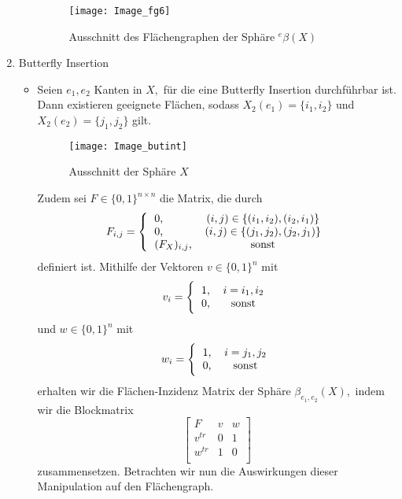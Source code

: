 \documentclass[12pt,titlepage,twoside,cleardoublepage]{article}
\theoremstyle{nummermitklammern}
\numberwithin{equation}{section}
\begin{document}
\begin{enumerate}
\begin{itemize}
\begin{figure}[H]
\begin{center}
\texttt{[image: Image\_fg6]}
\end{center}
\caption{Ausschnitt des Flächengraphen der Sphäre ${}^e\beta(X)$}
\end{figure}
\end{itemize}
\item Butterfly Insertion
\begin{itemize}
\item Seien $e_1,e_2$ Kanten in $X,$ für die eine Butterfly Insertion durchführbar ist. Dann existieren geeignete Flächen, sodass $X_2(e_1)=\{i_1,i_2\}$ und $X_2(e_2)=\{j_1,j_2\}$ gilt. 
\begin{figure}[H]
\begin{center}
\texttt{[image: Image\_butint]}
\end{center}
\caption{Ausschnitt der Sphäre $X$}
\end{figure}
Zudem sei $F\in \{0,1\}^{n\times n} $ die Matrix, die durch   
\[
F_{i,j}=
\Biggl{\{\begin{tabular}[l]{lcr}
0,&\textcolor{black}{$(i,j)\in \{(i_1,i_2),(i_2,i_1)\}$} \\
0,&\textcolor{black}{$(i,j)\in \{(j_1,j_2),(j_2,j_1)\}$} \\
$(F_{X})_{i,j}$,& sonst\\
\end{tabular}}
\]
definiert ist. Mithilfe der Vektoren $v\in \{0,1\}^n $ mit 
\[
v_{i}=
\Biggl{\{\begin{tabular}[l]{lcr}
1,& $i=i_1,i_2$\\
0,& sonst\\
\end{tabular}}
\]
und $w\in \{0,1\}^n $ mit 
\[
w_{i}=
\Biggl{\{\begin{tabular}[l]{lcr}
1,& $i=j_1,j_2$\\
0,& sonst\\ 
\end{tabular}}
\]
erhalten wir die Flächen-Inzidenz Matrix der Sphäre $\beta_{e_1,e_2}(X)
,$ indem wir die Blockmatrix 
\[
\left[ 
\begin{array}{c|cc} 
  F & v& w \\ 
  \hline 
  v^{tr}& 0 &1 \\
  w^{tr} &1 &0  \\
\end{array} 
\right]
\]
zusammensetzen. Betrachten wir nun die Auswirkungen dieser Manipulation auf den Flächengraph. 
\begin{figure}[H]

\end{figure}
\end{itemize}
\end{enumerate}
\end{document}
